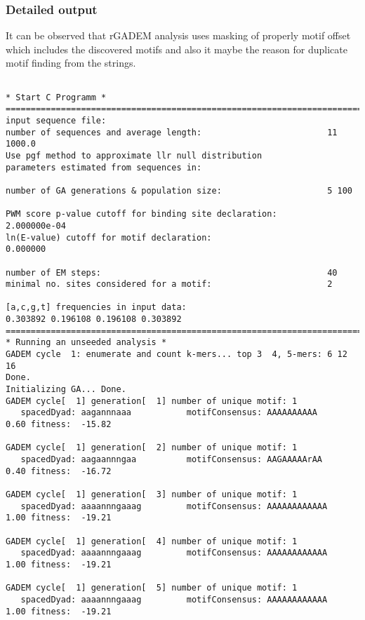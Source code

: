 \subsubsection{Detailed output}
It can be observed that rGADEM analysis uses masking of properly motif offset which includes the discovered motifs and also it maybe the reason for duplicate motif finding from the strings. 
\begin{lstlisting}

* Start C Programm *
========================================================================================
input sequence file:  
number of sequences and average length:                         11 1000.0
Use pgf method to approximate llr null distribution
parameters estimated from sequences in:  

number of GA generations & population size:                     5 100

PWM score p-value cutoff for binding site declaration:          2.000000e-04
ln(E-value) cutoff for motif declaration:                       0.000000

number of EM steps:                                             40
minimal no. sites considered for a motif:                       2

[a,c,g,t] frequencies in input data:                            0.303892 0.196108 0.196108 0.303892
========================================================================================
* Running an unseeded analysis *
GADEM cycle  1: enumerate and count k-mers... top 3  4, 5-mers: 6 12 16
Done.
Initializing GA... Done.
GADEM cycle[  1] generation[  1] number of unique motif: 1
   spacedDyad: aagannnaaa           motifConsensus: AAAAAAAAAA            0.60 fitness:  -15.82

GADEM cycle[  1] generation[  2] number of unique motif: 1
   spacedDyad: aagaannngaa          motifConsensus: AAGAAAAArAA           0.40 fitness:  -16.72

GADEM cycle[  1] generation[  3] number of unique motif: 1
   spacedDyad: aaaannngaaag         motifConsensus: AAAAAAAAAAAA          1.00 fitness:  -19.21

GADEM cycle[  1] generation[  4] number of unique motif: 1
   spacedDyad: aaaannngaaag         motifConsensus: AAAAAAAAAAAA          1.00 fitness:  -19.21

GADEM cycle[  1] generation[  5] number of unique motif: 1
   spacedDyad: aaaannngaaag         motifConsensus: AAAAAAAAAAAA          1.00 fitness:  -19.21


\end{lstlisting}
